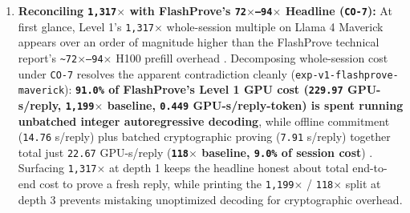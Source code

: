 \documentclass[11pt,letterpaper]{article}
\begin{document}
\begin{enumerate}
\item \textbf{Reconciling \texttt{1,317$\times$} with FlashProve's \texttt{72$\times$--94$\times$} Headline (\texttt{CO-7}):} At first glance, Level 1's \texttt{1,317$\times$} whole-session multiple on Llama 4 Maverick appears over an order of magnitude higher than the FlashProve technical report's \texttt{\textasciitilde{}72$\times$--94$\times$} H100 prefill overhead \cite{rinberg2026flashprove}. Decomposing whole-session cost under \texttt{CO-7} resolves the apparent contradiction cleanly (\texttt{exp-\allowbreak{}v1-\allowbreak{}flashprove-\allowbreak{}maverick}): \textbf{\texttt{91.0\%} of FlashProve's Level 1 GPU cost (\texttt{229.97} GPU-s/reply, \texttt{1,199$\times$} baseline, \texttt{0.449} GPU-s/reply-token) is spent running unbatched integer autoregressive decoding}, while offline commitment (\texttt{14.76} s/reply) plus batched cryptographic proving (\texttt{7.91} s/reply) together total just \texttt{22.67} GPU-s/reply (\textbf{\texttt{118$\times$} baseline, \texttt{9.0\%} of session cost}) \cite{iproofs2026}. Surfacing \texttt{1,317$\times$} at depth 1 keeps the headline honest about total end-to-end cost to prove a fresh reply, while printing the \texttt{1,199$\times$} / \texttt{118$\times$} split at depth 3 prevents mistaking unoptimized decoding for cryptographic overhead.

\end{enumerate}
\end{document}
